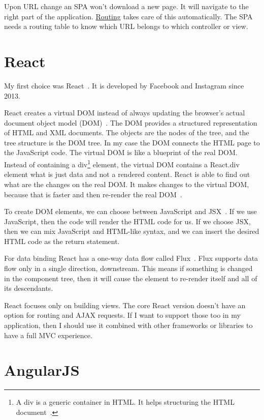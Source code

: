 Upon URL change an SPA won't download a new page. It will navigate to the right part of the application. \underline{Routing} takes care of this automatically. The SPA needs a routing table to know which URL belongs to which controller or view.

\section{React}

My first choice was React~\cite{React}. It is developed by Facebook and Instagram since 2013.

React creates a virtual DOM instead of always updating the browser's actual document object model (DOM)~\cite{dom}. The DOM provides a structured representation of HTML and XML documents. The objects are the nodes of the tree, and the tree structure is the DOM tree. In my case the DOM connects the HTML page to the JavaScript code. The virtual DOM is like a blueprint of the real DOM. Instead of containing a div\footnote{A div is a generic container in HTML. It helps structuring the HTML document~\cite{div}.} element, the virtual DOM contains a React.div element what is just data and not a rendered content. React is able to find out what are the changes on the real DOM. It makes changes to the virtual DOM, because that is faster and then re-render the real DOM~\cite{React-Virtual-DOM}.

To create DOM elements, we can choose between JavaScript and JSX~\cite{JSX}. If we use JavaScript, then the code will render the HTML code for us. If we choose JSX, then we can mix JavaScript and HTML-like syntax, and we can insert the desired HTML code as the return statement. 

For data binding React has a one-way data flow called Flux~\cite{Flux}. Flux supports data flow only in a single direction, downstream. This means if something is changed in the component tree, then it will cause the element to re-render itself and all of its descendants.

React focuses only on building views. The core React version doesn't have an option for routing and AJAX requests. If I want to support those too in my application, then I should use it combined with other frameworks or libraries to have a full MVC experience.

\section{AngularJS}

